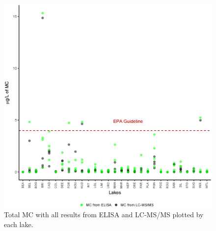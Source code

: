 \begin{figure}[!h]
	\includegraphics[width=\textwidth]{figures/Microcystin}
	\caption{Total MC with all results from ELISA and LC-MS/MS plotted by each lake.}
	\label{fig:microcystin}
\end{figure}


